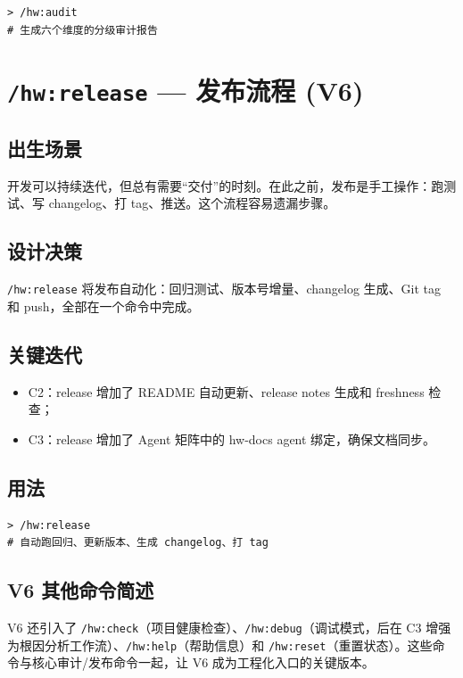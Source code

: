 \documentclass[
  outputdir=build,
  chapterstyle=cn,
  colorscheme=Simple,
  fontset=tech,
  code=false
]{Hypo-Note}
\begin{document}
\begin{lstlisting}[caption=运行审计]
> /hw:audit
# 生成六个维度的分级审计报告
\end{lstlisting}

\section{\texttt{/hw:release} — 发布流程 (V6)}

\subsection{出生场景}

开发可以持续迭代，但总有需要“交付”的时刻。在此之前，发布是手工操作：跑测试、写 changelog、打 tag、推送。这个流程容易遗漏步骤。

\subsection{设计决策}

\texttt{/hw:release} 将发布自动化：回归测试、版本号增量、changelog 生成、Git tag 和 push，全部在一个命令中完成。

\subsection{关键迭代}

\begin{itemize}[leftmargin=2em]
  \item C2：release 增加了 README 自动更新、release notes 生成和 freshness 检查；
  \item C3：release 增加了 Agent 矩阵中的 hw-docs agent 绑定，确保文档同步。
\end{itemize}

\subsection{用法}

\begin{lstlisting}[caption=执行发布]
> /hw:release
# 自动跑回归、更新版本、生成 changelog、打 tag
\end{lstlisting}

\subsection{V6 其他命令简述}

V6 还引入了 \texttt{/hw:check}（项目健康检查）、\texttt{/hw:debug}（调试模式，后在 C3 增强为根因分析工作流）、\texttt{/hw:help}（帮助信息）和 \texttt{/hw:reset}（重置状态）。这些命令与核心审计/发布命令一起，让 V6 成为工程化入口的关键版本。
\end{document}
